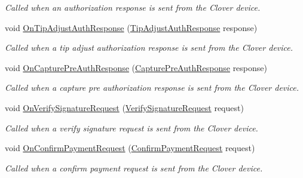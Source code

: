 \begin{DoxyCompactItemize}
\begin{DoxyCompactList}\small\item\em Called when an authorization response is sent from the Clover device. \end{DoxyCompactList}\item 
void \hyperlink{interfacecom_1_1clover_1_1remotepay_1_1sdk_1_1_i_clover_connector_listener_af972cda237b66fcd297117ae195537b7}{On\+Tip\+Adjust\+Auth\+Response} (\hyperlink{classcom_1_1clover_1_1remotepay_1_1sdk_1_1_tip_adjust_auth_response}{Tip\+Adjust\+Auth\+Response} response)
\begin{DoxyCompactList}\small\item\em Called when a tip adjust authorization response is sent from the Clover device. \end{DoxyCompactList}\item 
void \hyperlink{interfacecom_1_1clover_1_1remotepay_1_1sdk_1_1_i_clover_connector_listener_a1bc377474d004046068f80c5756b97da}{On\+Capture\+Pre\+Auth\+Response} (\hyperlink{classcom_1_1clover_1_1remotepay_1_1sdk_1_1_capture_pre_auth_response}{Capture\+Pre\+Auth\+Response} response)
\begin{DoxyCompactList}\small\item\em Called when a capture pre authorization response is sent from the Clover device. \end{DoxyCompactList}\item 
void \hyperlink{interfacecom_1_1clover_1_1remotepay_1_1sdk_1_1_i_clover_connector_listener_a7150246cea38e342996a2be9a7ed3990}{On\+Verify\+Signature\+Request} (\hyperlink{classcom_1_1clover_1_1remotepay_1_1sdk_1_1_verify_signature_request}{Verify\+Signature\+Request} request)
\begin{DoxyCompactList}\small\item\em Called when a verify signature request is sent from the Clover device. \end{DoxyCompactList}\item 
void \hyperlink{interfacecom_1_1clover_1_1remotepay_1_1sdk_1_1_i_clover_connector_listener_a2295110c07af954e141ee82acde10e8a}{On\+Confirm\+Payment\+Request} (\hyperlink{classcom_1_1clover_1_1remotepay_1_1sdk_1_1_confirm_payment_request}{Confirm\+Payment\+Request} request)
\begin{DoxyCompactList}\small\item\em Called when a confirm payment request is sent from the Clover device. \end{DoxyCompactList}\item 

\end{DoxyCompactItemize}
